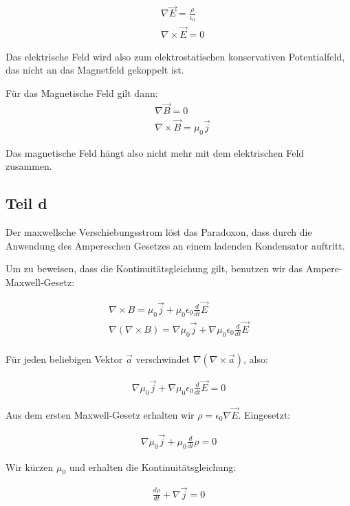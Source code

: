 \documentclass[a4paper,german,12pt,smallheadings]{scrartcl}
\begin{document}
\begin{align*}
  &\nabla \vec{E} = \frac{\rho}{\epsilon_0} \\
  &\nabla \times \vec{E} = 0
\end{align*}

Das elektrische Feld wird also zum elektrostatischen konservativen
Potentialfeld, das nicht an das Magnetfeld gekoppelt ist.

Für das Magnetische Feld gilt dann:
\begin{align*}
  &\nabla \vec{B} = 0 \\
  &\nabla \times \vec{B} = \mu_0 \vec{j}
\end{align*}

Das magnetische Feld hängt also nicht mehr mit dem elektrischen Feld zusammen.

\subsection*{Teil d}

Der maxwellsche Verschiebungsstrom löst das Paradoxon, dass durch die Anwendung
des Ampereschen Gesetzes an einem ladenden Kondensator auftritt.

Um zu beweisen, dass die Kontinuitätsgleichung gilt, benutzen wir das
Ampere-Maxwell-Gesetz:

\begin{align*}
  \nabla \times B = \mu_0 \vec{j} + \mu_0 \epsilon_0 \frac{d}{dt} \vec{E} \\
  \nabla(\nabla \times B) = \nabla \mu_0 \vec{j} + \nabla \mu_0 \epsilon_0 \frac{d}{dt} \vec{E} \\
\end{align*}

Für jeden beliebigen Vektor $\vec{a}$ verschwindet $\nabla(\nabla \times \vec{a})$, also:

\begin{align*}
  \nabla \mu_0 \vec{j} + \nabla \mu_0 \epsilon_0 \frac{d}{dt} \vec{E} = 0
\end{align*}

Aus dem ersten Maxwell-Gesetz erhalten wir $\rho = \epsilon_0 \nabla \vec{E}$.
Eingesetzt:

\begin{align*}
  \nabla \mu_0 \vec{j} + \mu_0 \frac{d}{dt} \rho = 0
\end{align*}

Wir kürzen $\mu_0$ und erhalten die Kontinuitätsgleichung:

\begin{align*}
  \frac{d \rho}{d t} + \nabla \vec{j} = 0
\end{align*}
\end{document}
